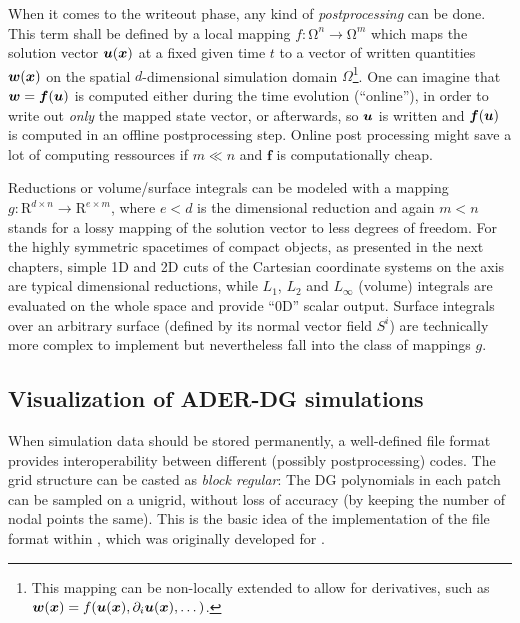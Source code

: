When it comes to the writeout phase, any kind of \emph{postprocessing} can be
done. This term shall be defined by a local mapping
$f: \mathrm \Omega^n \to \mathrm \Omega^m$ which maps the solution vector
$\boldsymbol{u}(\boldsymbol{x})$ at a fixed given time $t$
to a vector of written quantities $\boldsymbol w(\boldsymbol{x})$ on the spatial 
$d$-dimensional simulation domain $\Omega$\footnote{
  This mapping can be non-locally extended to allow for derivatives, such
  as $\boldsymbol w(\boldsymbol{x}) = f(\boldsymbol{u}(\boldsymbol{x}), \partial_i \boldsymbol{u}(\boldsymbol{x}), \dots)$.
}. One can imagine that
$\boldsymbol w = \boldsymbol f(\boldsymbol{u})$ is computed either during the time
evolution (``online''), in order to write out \emph{only} the mapped state
vector, or afterwards, so $\boldsymbol{u}$ is written and $\boldsymbol f(\boldsymbol{u})$ is computed
in an offline postprocessing step. 
Online post processing might save a lot of computing ressources
if $m \ll n$ and $\boldsymbol f$ is computationally cheap.

Reductions or volume/surface integrals can be modeled with a mapping
$g: \mathrm R^{d\times n} \to \mathrm R^{e \times m}$, where $e<d$ is the
dimensional reduction and again $m<n$ stands for a lossy mapping of the
solution vector to less degrees of freedom. For the highly symmetric spacetimes
of compact objects, as presented in the next chapters, simple 1D and 2D cuts
of the Cartesian coordinate systems on the axis are typical dimensional
reductions, while $L_1$, $L_2$ and $L_\infty$  (volume) integrals are evaluated
on the whole space and provide ``0D'' scalar output. Surface integrals over
an arbitrary surface (defined by its normal vector field $S^i$) are technically
more complex to implement but nevertheless fall into the class of mappings $g$.

\subsection{Visualization of ADER-DG simulations}
When simulation data should be stored permanently, a well-defined file format
provides interoperability between different (possibly postprocessing) codes.
The  grid structure can be casted as \emph{block regular}:
The DG polynomials in each patch can be sampled on a unigrid, without loss
of accuracy (\ie by keeping the number of nodal points the same). This is
the basic idea of the implementation of the  file format
within ,
which was originally developed for  \cite{Reisswig:2010}.


